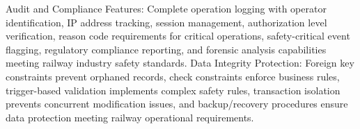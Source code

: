 Audit and Compliance Features: Complete operation logging with operator identification, IP address tracking, session management, authorization level verification, reason code requirements for critical operations, safety-critical event flagging, regulatory compliance reporting, and forensic analysis capabilities meeting railway industry safety standards.
Data Integrity Protection: Foreign key constraints prevent orphaned records, check constraints enforce business rules, trigger-based validation implements complex safety rules, transaction isolation prevents concurrent modification issues, and backup/recovery procedures ensure data protection meeting railway operational requirements.